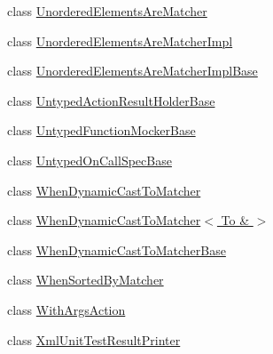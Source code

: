 \begin{DoxyCompactItemize}
class \hyperlink{classtesting_1_1internal_1_1UnorderedElementsAreMatcher}{Unordered\+Elements\+Are\+Matcher}
\item 
class \hyperlink{classtesting_1_1internal_1_1UnorderedElementsAreMatcherImpl}{Unordered\+Elements\+Are\+Matcher\+Impl}
\item 
class \hyperlink{classtesting_1_1internal_1_1UnorderedElementsAreMatcherImplBase}{Unordered\+Elements\+Are\+Matcher\+Impl\+Base}
\item 
class \hyperlink{classtesting_1_1internal_1_1UntypedActionResultHolderBase}{Untyped\+Action\+Result\+Holder\+Base}
\item 
class \hyperlink{classtesting_1_1internal_1_1UntypedFunctionMockerBase}{Untyped\+Function\+Mocker\+Base}
\item 
class \hyperlink{classtesting_1_1internal_1_1UntypedOnCallSpecBase}{Untyped\+On\+Call\+Spec\+Base}
\item 
class \hyperlink{classtesting_1_1internal_1_1WhenDynamicCastToMatcher}{When\+Dynamic\+Cast\+To\+Matcher}
\item 
class \hyperlink{classtesting_1_1internal_1_1WhenDynamicCastToMatcher_3_01To_01_6_01_4}{When\+Dynamic\+Cast\+To\+Matcher$<$ To \& $>$}
\item 
class \hyperlink{classtesting_1_1internal_1_1WhenDynamicCastToMatcherBase}{When\+Dynamic\+Cast\+To\+Matcher\+Base}
\item 
class \hyperlink{classtesting_1_1internal_1_1WhenSortedByMatcher}{When\+Sorted\+By\+Matcher}
\item 
class \hyperlink{classtesting_1_1internal_1_1WithArgsAction}{With\+Args\+Action}
\item 
class \hyperlink{classtesting_1_1internal_1_1XmlUnitTestResultPrinter}{Xml\+Unit\+Test\+Result\+Printer}
\end{DoxyCompactItemize}

